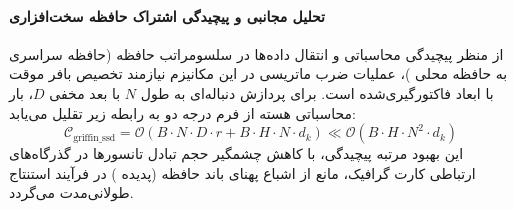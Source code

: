 \paragraph{تحلیل مجانبی و پیچیدگی اشتراک حافظه سخت‌افزاری}
از منظر پیچیدگی محاسباتی و انتقال داده‌ها در سلسومراتب حافظه (حافظه سراسری  به حافظه محلی )، عملیات ضرب ماتریسی در این مکانیزم نیازمند تخصیص بافر موقت با ابعاد فاکتورگیری‌شده است. برای پردازش دنباله‌ای به طول $N$ با بعد مخفی $D$، بار محاسباتی هسته از فرم درجه دو به رابطه زیر تقلیل می‌یابد:
\begin{equation}
\label{eq:complexity_griffin_ssd}
\mathcal{C}_{\text{griffin\_ssd}} = \mathcal{O}\left( B \cdot N \cdot D \cdot r + B \cdot H \cdot N \cdot d_k \right) \ll \mathcal{O}\left( B \cdot H \cdot N^2 \cdot d_k \right)
\end{equation}
این بهبود مرتبه پیچیدگی، با کاهش چشمگیر حجم تبادل تانسورها در گذرگاه‌های ارتباطی کارت گرافیک، مانع از اشباع پهنای باند حافظه (پدیده ) در فرآیند استنتاج طولانی‌مدت می‌گردد.
